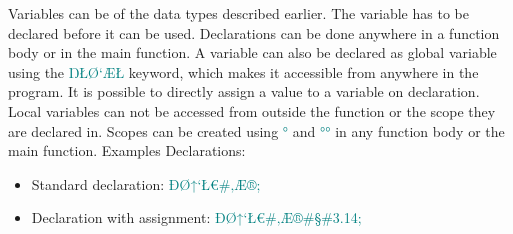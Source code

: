 Variables can be of the data types described earlier. 
The variable has to be declared before it can be used.
Declarations can be done anywhere in a function body or in the main function.
A variable can also be declared as global variable using the \textcolor{teal}{ŊŁØ‘ÆŁ} keyword,
which makes it accessible from anywhere in the program.
It is possible to directly assign a value to a variable on declaration.
Local variables can not be accessed from outside the function or the scope they are declared in.
Scopes can be created using \textcolor{teal}{°} and \textcolor{teal}{°°} in any
function body or the main function.
\newline
\newline
Examples Declarations:
\begin{itemize}[noitemsep]
    \item Standard declaration: \textcolor{teal}{ÐØ↑‘Ł€\#‚Æ®;}
    \item Declaration with assignment: \textcolor{teal}{ÐØ↑‘Ł€\#‚Æ®\#§\#3.14;}
\end{itemize}

